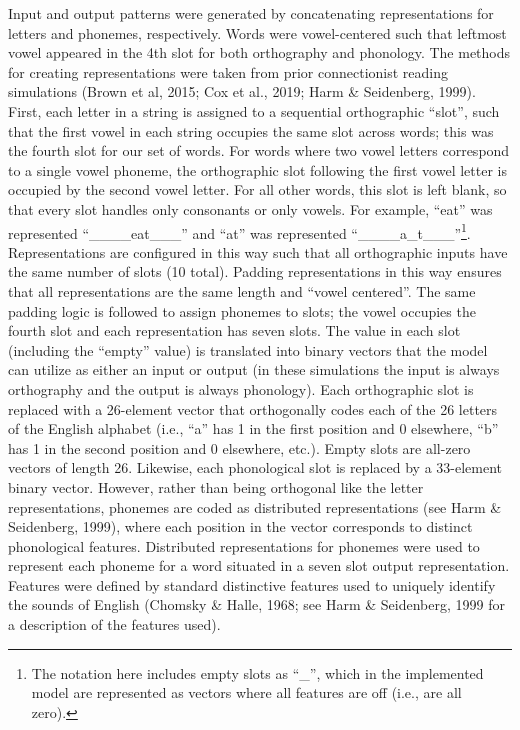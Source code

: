 \documentclass[
  ,man,floatsintext]{apa6}
\begin{document}
Input and output patterns were generated by concatenating representations for letters and phonemes, respectively. Words were vowel-centered such that leftmost vowel appeared in the 4th slot for both orthography and phonology. The methods for creating representations were taken from prior connectionist reading simulations (Brown et al, 2015; Cox et al., 2019; Harm \& Seidenberg, 1999). First, each letter in a string is assigned to a sequential orthographic ``slot'', such that the first vowel in each string occupies the same slot across words; this was the fourth slot for our set of words. For words where two vowel letters correspond to a single vowel phoneme, the orthographic slot following the first vowel letter is occupied by the second vowel letter. For all other words, this slot is left blank, so that every slot handles only consonants or only vowels. For example, ``eat'' was represented ``\_\_\_\_eat\_\_\_'' and ``at'' was represented ``\_\_\_\_a\_t\_\_\_''\footnote{The notation here includes empty slots as ``\_'', which in the implemented model are represented as vectors where all features are off (i.e., are all zero).}. Representations are configured in this way such that all orthographic inputs have the same number of slots (10 total). Padding representations in this way ensures that all representations are the same length and ``vowel centered''. The same padding logic is followed to assign phonemes to slots; the vowel occupies the fourth slot and each representation has seven slots. The value in each slot (including the ``empty'' value) is translated into binary vectors that the model can utilize as either an input or output (in these simulations the input is always orthography and the output is always phonology). Each orthographic slot is replaced with a 26-element vector that orthogonally codes each of the 26 letters of the English alphabet (i.e., ``a'' has 1 in the first position and 0 elsewhere, ``b'' has 1 in the second position and 0 elsewhere, etc.). Empty slots are all-zero vectors of length 26. Likewise, each phonological slot is replaced by a 33-element binary vector. However, rather than being orthogonal like the letter representations, phonemes are coded as distributed representations (see Harm \& Seidenberg, 1999), where each position in the vector corresponds to distinct phonological features. Distributed representations for phonemes were used to represent each phoneme for a word situated in a seven slot output representation. Features were defined by standard distinctive features used to uniquely identify the sounds of English (Chomsky \& Halle, 1968; see Harm \& Seidenberg, 1999 for a description of the features used).
\end{document}
